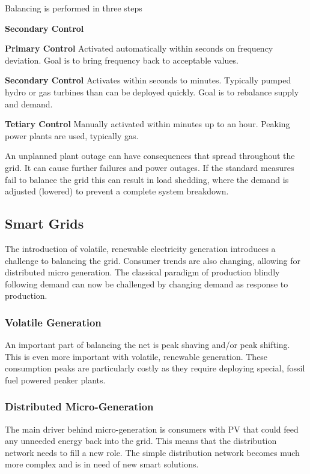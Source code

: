 Balancing is performed in three steps
\begin{labeling}{\textbf{Secondary Control}}
\item [\textbf{Primary Control}] Activated automatically within seconds on frequency deviation. Goal is to bring frequency back to acceptable values.
\item [\textbf{Secondary Control}] Activates within seconds to minutes. Typically pumped hydro or gas turbines than can be deployed quickly. Goal is to rebalance supply and demand.
\item [\textbf{Tetiary Control}] Manually activated within minutes up to an hour. Peaking power plants are used, typically gas.
\end{labeling}

An unplanned plant outage can have consequences that spread throughout the grid.
It can cause further failures and power outages.
If the standard measures fail to balance the grid this can result in load shedding, where the demand is adjusted (lowered) to prevent a complete system breakdown.

\subsection{Smart Grids}
The introduction of volatile, renewable electricity generation introduces a challenge to balancing the grid.
Consumer trends are also changing, allowing for distributed micro generation.
The classical paradigm of production blindly following demand can now be challenged by changing demand as response to production.

\subsubsection{Volatile Generation}
An important part of balancing the net is peak shaving and/or peak shifting.
This is even more important with volatile, renewable generation.
These consumption peaks are particularly costly as they require deploying special, fossil fuel powered peaker plants.

\subsubsection{Distributed Micro-Generation}
The main driver behind micro-generation is consumers with PV that could feed any unneeded energy back into the grid.
This means that the distribution network needs to fill a new role.
The simple distribution network becomes much more complex and is in need of new smart solutions.

